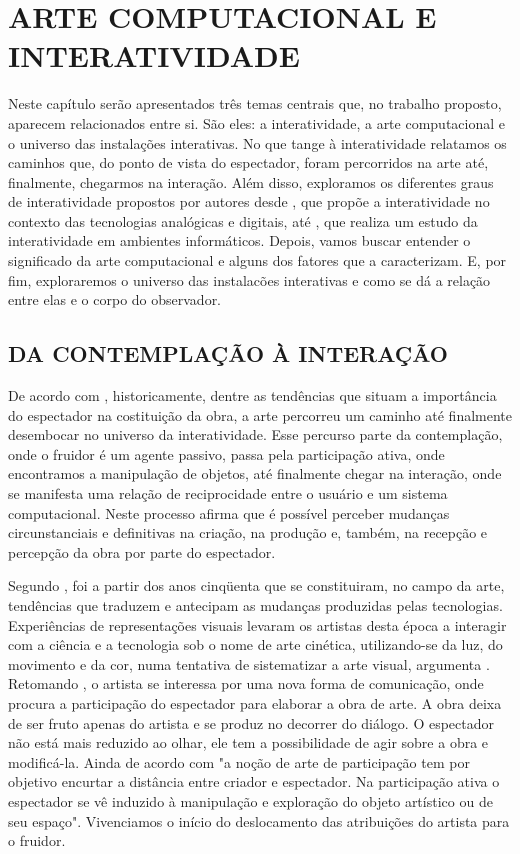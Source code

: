 \chapter{ARTE COMPUTACIONAL E INTERATIVIDADE}

Neste capítulo serão apresentados três temas centrais que, no trabalho proposto, aparecem relacionados entre si. São eles: a interatividade, a arte computacional e o universo das instalações interativas. No que tange à interatividade relatamos os caminhos que, do ponto de vista do espectador, foram percorridos na arte até, finalmente, chegarmos na interação. Além disso, exploramos os diferentes graus de interatividade propostos por autores desde , que propõe a interatividade no contexto das tecnologias analógicas e digitais, até  , que realiza um estudo da interatividade em ambientes informáticos. Depois, vamos buscar entender o significado da arte computacional e alguns dos fatores que a caracterizam. E, por fim, exploraremos o universo das instalacões interativas e como se dá a relação entre elas e o corpo do observador.




\section{DA CONTEMPLAÇÃO À INTERAÇÃO}

De acordo com , historicamente, dentre as tendências que situam a importância do espectador na costituição da obra, a arte percorreu um caminho até finalmente desembocar no universo da interatividade. Esse percurso parte da contemplação, onde o fruidor é um agente passivo, passa pela participação ativa, onde encontramos a manipulação de objetos, até finalmente chegar na interação, onde se manifesta uma relação de reciprocidade entre o usuário e um sistema computacional. Neste processo  afirma que é possível perceber mudanças circunstanciais e definitivas na criação, na produção e, também, na recepção e percepção da obra por parte do espectador. 

Segundo , foi a partir dos anos cinqüenta que se constituiram, no campo da arte, tendências que traduzem e antecipam as mudanças produzidas pelas tecnologias. Experiências de representações visuais levaram os artistas desta época a interagir com a ciência e a tecnologia sob o nome de arte cinética, utilizando-se da luz, do movimento e da cor, numa tentativa de sistematizar a arte visual, argumenta . Retomando , o artista se interessa por uma nova forma de comunicação, onde procura a participação do espectador para elaborar a obra de arte. A obra deixa de ser fruto apenas do artista e se produz no decorrer do diálogo. O espectador não está mais reduzido ao olhar, ele tem a possibilidade de agir sobre a obra e modificá-la. Ainda de acordo com  "a noção de arte de participação tem por objetivo encurtar a distância entre criador e espectador. Na participação ativa o espectador se vê induzido à manipulação e exploração do objeto artístico ou de seu espaço". Vivenciamos o início do deslocamento das atribuições do artista para o fruidor. 


